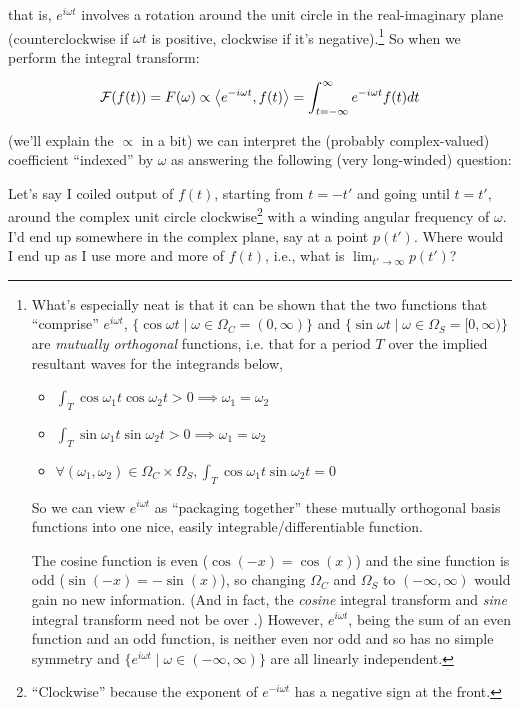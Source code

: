 \documentclass[letterpaper,12pt]{report}
\providecommand{\tightlist}{%
  \setlength{\itemsep}{0pt}\setlength{\parskip}{0pt}}
\begin{document}
that is, \(e^{i\omega t}\) involves a rotation around 
the unit circle in the real-imaginary plane 
(counterclockwise if \(\omega t\) is positive,
clockwise if it's negative).\footnote
{
  What's especially neat is
  that it can be shown that the two functions that ``comprise''
  \(e^{i\omega t}\), 
  \(\{\cos{\omega t} \mid \omega \in \Omega_{C} = (0, \infty) \}\) and 
  \(\{\sin{\omega t} \mid \omega \in \Omega_{S} = [0, \infty) \}\) are 
  \emph{mutually orthogonal} functions, i.e. that
  for a period \(T\) over the implied resultant waves
  for the integrands below,
  \begin{itemize}
    \item
      \(\int_{T}\cos{\omega_1t}\cos{\omega_2t} > 0 \implies \omega_1 = \omega_2\)
    \item
      \(\int_{T}\sin{\omega_1t}\sin{\omega_2t} > 0 \implies \omega_1 = \omega_2\)
    \item
    \(\forall 
      (\omega_1, \omega_2) \in \Omega_{C} \times \Omega_{S}, 
    \int_{T}\cos{\omega_1t}\sin{\omega_2t} = 0 \)
  \end{itemize}
  So we can view \(e^{i\omega t}\) as ``packaging together''
  these mutually orthogonal basis functions into one nice,
  easily integrable/differentiable function.\par

  The cosine function is even (\(\cos(-x) = \cos(x)\)) and
  the sine function is odd (\(\sin(-x) = -\sin(x)\)), so
  changing \(\Omega_{C}\) and \(\Omega_{S}\) to 
  \((-\infty, \infty)\) would gain no new information.
  (And in fact, the \emph{cosine} integral transform and
  \emph{sine} integral transform need not be over .)
  However, \(e^{i\omega t}\), being the sum of an even function
  and an odd function, is neither even nor odd and so
  has no simple symmetry and
  \(\{e^{i\omega t} \mid \omega \in (-\infty, \infty)\}\)
  are all linearly independent.
}
So when we perform the integral transform:

\[\fancy{F}(f(t)) = F(\omega) 
  \propto \innerprod[e^{-i\omega t}][f(t)]
  = \int_{t=-\infty}^{\infty} e^{-i\omega t} f(t) dt\]

(we'll explain the \(\propto\) in a bit)
we can interpret the (probably complex-valued) coefficient
``indexed'' by \(\omega\) as answering the following
(very long-winded) question:\par

Let's say
I coiled output of \(f(t)\), 
starting from \(t=-t'\) and going until \(t=t'\),
around the complex unit circle clockwise\footnote{
  ``Clockwise'' because the exponent of \(e^{-i\omega t}\)
  has a negative sign at the front.
}
with a winding angular frequency of \(\omega\). I'd end
up somewhere in the complex plane, say at a point \(p(t')\).
Where would I end up as I use more and more of
\(f(t)\), i.e., what is \(\lim_{t' \rightarrow \infty} p(t')\)?
\par
\end{document}
